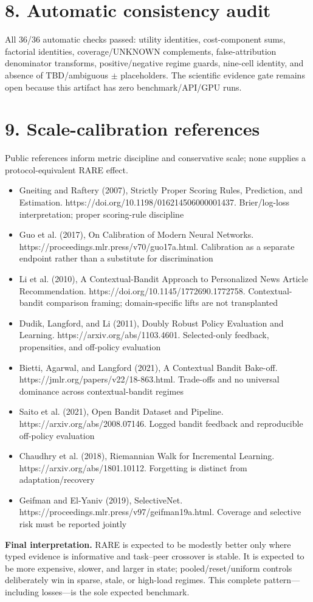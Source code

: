 \documentclass[10pt,a4paper,landscape]{article}
\begin{document}
\section*{8. Automatic consistency audit}
All 36/36 automatic checks passed: utility identities, cost-component sums, factorial identities, coverage/UNKNOWN complements, false-attribution denominator transforms, positive/negative regime guards, nine-cell identity, and absence of TBD/ambiguous $\pm$ placeholders. The scientific evidence gate remains open because this artifact has zero benchmark/API/GPU runs.
\section*{9. Scale-calibration references}
\small Public references inform metric discipline and conservative scale; none supplies a protocol-equivalent RARE effect.\begin{itemize}
\item Gneiting and Raftery (2007), Strictly Proper Scoring Rules, Prediction, and Estimation. https://doi.org/10.1198/016214506000001437. Brier/log-loss interpretation; proper scoring-rule discipline
\item Guo et al. (2017), On Calibration of Modern Neural Networks. https://proceedings.mlr.press/v70/guo17a.html. Calibration as a separate endpoint rather than a substitute for discrimination
\item Li et al. (2010), A Contextual-Bandit Approach to Personalized News Article Recommendation. https://doi.org/10.1145/1772690.1772758. Contextual-bandit comparison framing; domain-specific lifts are not transplanted
\item Dudik, Langford, and Li (2011), Doubly Robust Policy Evaluation and Learning. https://arxiv.org/abs/1103.4601. Selected-only feedback, propensities, and off-policy evaluation
\item Bietti, Agarwal, and Langford (2021), A Contextual Bandit Bake-off. https://jmlr.org/papers/v22/18-863.html. Trade-offs and no universal dominance across contextual-bandit regimes
\item Saito et al. (2021), Open Bandit Dataset and Pipeline. https://arxiv.org/abs/2008.07146. Logged bandit feedback and reproducible off-policy evaluation
\item Chaudhry et al. (2018), Riemannian Walk for Incremental Learning. https://arxiv.org/abs/1801.10112. Forgetting is distinct from adaptation/recovery
\item Geifman and El-Yaniv (2019), SelectiveNet. https://proceedings.mlr.press/v97/geifman19a.html. Coverage and selective risk must be reported jointly
\end{itemize}
\textbf{Final interpretation.} RARE is expected to be modestly better only where typed evidence is informative and task--peer crossover is stable. It is expected to be more expensive, slower, and larger in state; pooled/reset/uniform controls deliberately win in sparse, stale, or high-load regimes. This complete pattern---including losses---is the sole expected benchmark.
\end{document}
